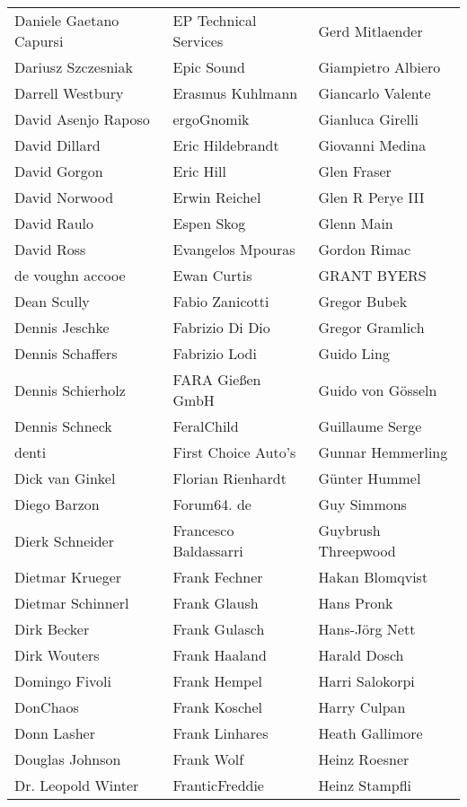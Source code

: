 \begin{tabular}{p{4.5cm}p{4.5cm}p{4.5cm}}
Daniele Gaetano Capursi & EP Technical Services & Gerd Mitlaender \\
Dariusz Szczesniak & Epic Sound & Giampietro Albiero \\
Darrell Westbury & Erasmus Kuhlmann & Giancarlo Valente \\
David Asenjo Raposo & ergoGnomik & Gianluca Girelli \\
David Dillard & Eric Hildebrandt & Giovanni Medina \\
David Gorgon & Eric Hill & Glen Fraser \\
David Norwood & Erwin Reichel & Glen R Perye III \\
David Raulo & Espen Skog & Glenn Main \\
David Ross & Evangelos Mpouras & Gordon Rimac \\
de voughn accooe & Ewan Curtis & GRANT BYERS \\
Dean Scully & Fabio Zanicotti & Gregor Bubek \\
Dennis Jeschke & Fabrizio Di Dio & Gregor Gramlich \\
Dennis Schaffers & Fabrizio Lodi & Guido Ling \\
Dennis Schierholz & FARA Gießen GmbH & Guido von Gösseln \\
Dennis Schneck & FeralChild & Guillaume Serge \\
denti & First Choice Auto's & Gunnar Hemmerling \\
Dick van Ginkel & Florian Rienhardt & Günter Hummel \\
Diego Barzon & Forum64. de & Guy Simmons \\
Dierk Schneider & Francesco Baldassarri & Guybrush Threepwood \\
Dietmar Krueger & Frank Fechner & Hakan Blomqvist \\
Dietmar Schinnerl & Frank Glaush & Hans Pronk \\
Dirk Becker & Frank Gulasch & Hans-Jörg Nett \\
Dirk Wouters & Frank Haaland & Harald Dosch \\
Domingo Fivoli & Frank Hempel & Harri Salokorpi \\
DonChaos & Frank Koschel & Harry Culpan \\
Donn Lasher & Frank Linhares & Heath Gallimore \\
Douglas Johnson & Frank Wolf & Heinz Roesner \\
Dr. Leopold Winter & FranticFreddie & Heinz Stampfli \\

\end{tabular}
